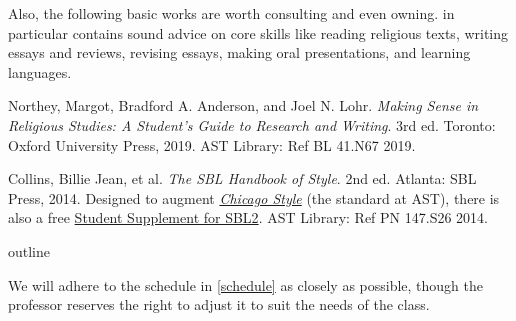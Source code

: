 \documentclass[titlepage]{article}
\begin{document}
Also, the following basic works are worth consulting and even owning.
\cite{rlgs} in particular contains sound advice on core skills like
reading religious texts, writing essays and reviews, revising essays,
making oral presentations, and learning languages.

\begingroup
\renewcommand{\section}[2]{}%
\begin{thebibliography}{Irenaeus}%

	 Northey, Margot, Bradford A. Anderson, and Joel N. Lohr.
	\emph{Making Sense in Religious Studies: A Student's Guide to Research and Writing}.
	3rd ed. Toronto: Oxford University Press, 2019. AST Library: Ref BL 41.N67 2019.

	 Collins, Billie Jean, et al.
	\emph{The SBL Handbook of Style}.
	2nd ed. Atlanta: SBL Press, 2014.
	Designed to augment \href{https://proxy.openathens.net/login?qurl=https%3A%2F%2Fwww.chicagomanualofstyle.org%2Fbook%2Fed17%2Ffrontmatter%2Ftoc.html}{\emph{Chicago Style}}
	(the standard at AST), there is also a free
	\href{https://www.sbl-site.org/assets/pdfs/pubs/SBLHSsupp2015-02.pdf}{Student Supplement for SBL2}. AST Library: Ref PN 147.S26 2014.

\end{thebibliography}
\endgroup


\section{Course Outline}
\label{outline}

We will adhere to the schedule in \autoref{schedule} as closely as
possible, though the professor reserves the right to adjust it to suit
the needs of the class.
\end{document}
